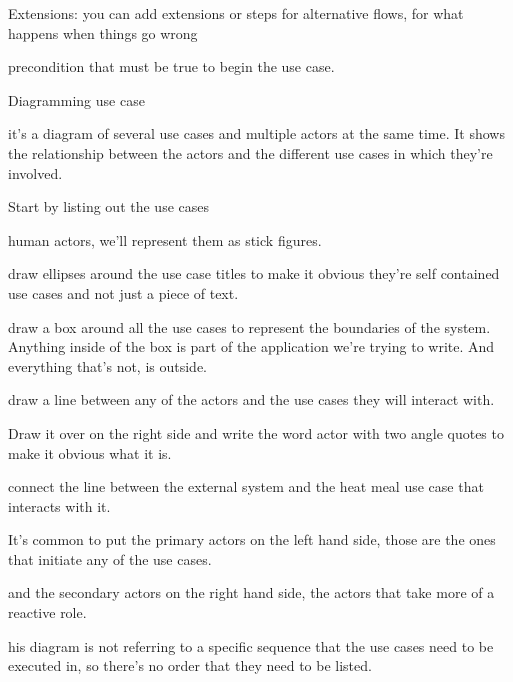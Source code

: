 Extensions:
  you can add extensions or steps for alternative flows, for what happens when things go wrong

  precondition that must be true to begin the use case. 

Diagramming use case 

  it's a diagram of several use cases and multiple actors at the same time. 
  It shows the relationship between the actors and the different use cases in which they're involved.

  Start by listing out the use cases

  human actors, we'll represent them as stick figures.

  draw ellipses around the use case titles to make it obvious they're self contained use cases and not just a piece of text.

  draw a box around all the use cases to represent the boundaries of the system. 
  Anything inside of the box is part of the application we're trying to write.
  And everything that's not, is outside.

  draw a line between any of the actors and the use cases they will interact with.

  Draw it over on the right side and write the word actor with two angle quotes to make it obvious what it is. 

  connect the line between the external system and the heat meal use case that interacts with it.

  It's common to put the primary actors on the left hand side, those are the ones that initiate any of the use cases.

  and the secondary actors on the right hand side, the actors that take more of a reactive role.

  his diagram is not referring to a specific sequence that the use cases need to be executed in, so there's no order that they need to be listed.